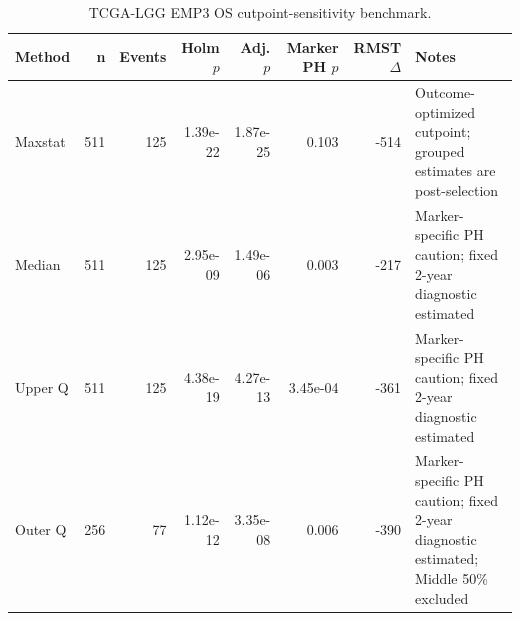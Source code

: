 \begin{table}[t]
\centering
\caption{TCGA-LGG EMP3 OS cutpoint-sensitivity benchmark.}
\label{tab:lgg-emp3-os-cutpoints}
\begin{tabular}{lrrrrrrl}
\toprule
Method & n & Events & Holm $p$ & Adj. $p$ & Marker PH $p$ & RMST $\Delta$ & Notes \\
\midrule
Maxstat & 511 & 125 & 1.39e-22 & 1.87e-25 & 0.103 & -514 & Outcome-optimized cutpoint; grouped estimates are post-selection \\
Median & 511 & 125 & 2.95e-09 & 1.49e-06 & 0.003 & -217 & Marker-specific PH caution; fixed 2-year diagnostic estimated \\
Upper Q & 511 & 125 & 4.38e-19 & 4.27e-13 & 3.45e-04 & -361 & Marker-specific PH caution; fixed 2-year diagnostic estimated \\
Outer Q & 256 & 77 & 1.12e-12 & 3.35e-08 & 0.006 & -390 & Marker-specific PH caution; fixed 2-year diagnostic estimated; Middle 50\% excluded \\
\bottomrule
\end{tabular}
\end{table}
